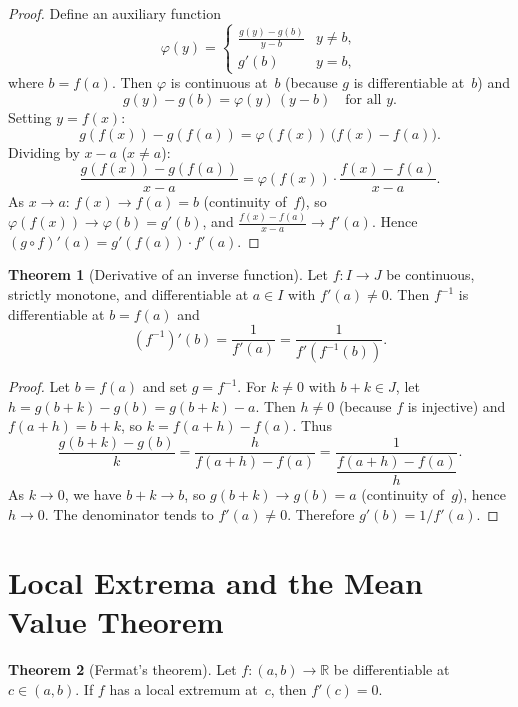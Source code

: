 \documentclass[12pt,a4paper,openany]{book}
\theoremstyle{definition}
\newtheorem{theorem}{Theorem}[chapter]
\theoremstyle{remark}
\begin{document}
\begin{proof}
Define an auxiliary function
\[
  \varphi(y) =
  \begin{cases}
    \displaystyle\frac{g(y)-g(b)}{y-b} & y\neq b,\\[6pt]
    g'(b) & y=b,
  \end{cases}
\]
where $b=f(a)$.  Then $\varphi$ is continuous at~$b$ (because $g$ is
differentiable at~$b$) and
\[
  g(y)-g(b) = \varphi(y)\,(y-b)
  \quad\text{for all } y.
\]
Setting $y=f(x)$:
\[
  g(f(x))-g(f(a)) = \varphi(f(x))\,\bigl(f(x)-f(a)\bigr).
\]
Dividing by $x-a$ ($x\neq a$):
\[
  \frac{g(f(x))-g(f(a))}{x-a}
  = \varphi(f(x))\cdot\frac{f(x)-f(a)}{x-a}.
\]
As $x\to a$: $f(x)\to f(a)=b$ (continuity of~$f$), so
$\varphi(f(x))\to\varphi(b)=g'(b)$, and
$\frac{f(x)-f(a)}{x-a}\to f'(a)$.  Hence
$(g\circ f)'(a)=g'(f(a))\cdot f'(a)$.
\end{proof}

\begin{theorem}[Derivative of an inverse function]
\label{thm:inv-deriv}
Let $f\colon I\to J$ be continuous, strictly monotone, and
differentiable at $a\in I$ with $f'(a)\neq 0$.  Then $f^{-1}$ is
differentiable at $b=f(a)$ and
\[
  (f^{-1})'(b) = \frac{1}{f'(a)} = \frac{1}{f'(f^{-1}(b))}.
\]
\end{theorem}

\begin{proof}
Let $b=f(a)$ and set $g=f^{-1}$.  For $k\neq 0$ with $b+k\in J$,
let $h=g(b+k)-g(b)=g(b+k)-a$.  Then $h\neq 0$ (because $f$ is
injective) and $f(a+h)=b+k$, so $k=f(a+h)-f(a)$.  Thus
\[
  \frac{g(b+k)-g(b)}{k}
  = \frac{h}{f(a+h)-f(a)}
  = \frac{1}{\dfrac{f(a+h)-f(a)}{h}}.
\]
As $k\to 0$, we have $b+k\to b$, so $g(b+k)\to g(b)=a$ (continuity
of~$g$), hence $h\to 0$.  The denominator tends to $f'(a)\neq 0$.
Therefore $g'(b)=1/f'(a)$.
\end{proof}

\section{Local Extrema and the Mean Value Theorem}

\begin{theorem}[Fermat's theorem]\label{thm:fermat}
Let $f\colon(a,b)\to\mathbb{R}$ be differentiable at $c\in(a,b)$.
If $f$ has a local extremum at~$c$, then $f'(c)=0$.
\end{theorem}
\end{document}
